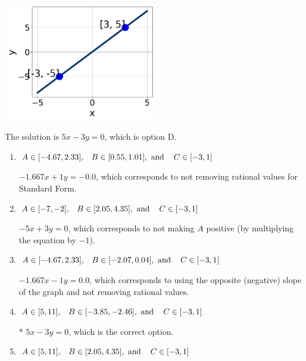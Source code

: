 \documentclass{extbook}[14pt]
\begin{document}
\begin{enumerate}
{\begin{center}
    \includegraphics[width=0.5\textwidth]{../Figures/linearGraphToStandardCopyC.png}
\end{center}




The solution is \( 5x - 3y = 0 \), which is option D.\begin{enumerate}[label=\Alph*.]
\item \( A \in [-4.67, 2.33], \hspace{3mm} B \in [0.55, 1.01], \text{ and } \hspace{3mm} C \in [-3, 1] \)

 $-1.667x + 1y = -0.0$, which corresponds to not removing rational values for Standard Form.
\item \( A \in [-7, -2], \hspace{3mm} B \in [2.05, 4.35], \text{ and } \hspace{3mm} C \in [-3, 1] \)

 $-5x + 3y = 0$, which corresponds to not making $A$ positive (by multiplying the equation by $-1$).
\item \( A \in [-4.67, 2.33], \hspace{3mm} B \in [-2.07, 0.04], \text{ and } \hspace{3mm} C \in [-3, 1] \)

 $-1.667x - 1y = 0.0$, which corresponds to using the opposite (negative) slope of the graph and not removing rational values.
\item \( A \in [5, 11], \hspace{3mm} B \in [-3.85, -2.46], \text{ and } \hspace{3mm} C \in [-3, 1] \)

* $5x - 3y = 0$, which is the correct option.
\item \( A \in [5, 11], \hspace{3mm} B \in [2.05, 4.35], \text{ and } \hspace{3mm} C \in [-3, 1] \)


\end{enumerate}}
\end{enumerate}
\end{document}
